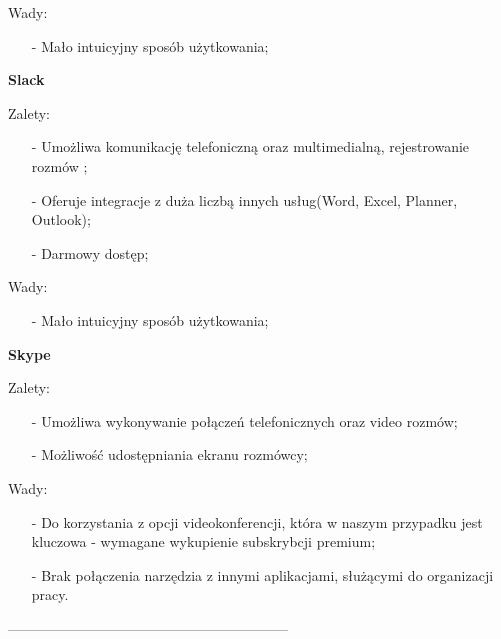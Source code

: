 \documentclass[a4paper,titleauthor]{mwart}
\begin{document}
\indent

Wady:
\begin{itemize}

\item[-]
Mało intuicyjny sposób użytkowania;
\end{itemize}
\vspace{0,8cm}

\textbf{Slack} \newline
\indent

Zalety:
\begin{itemize}

\item[-]
Umożliwa komunikację telefoniczną oraz multimedialną, rejestrowanie rozmów ;

\item[-]
Oferuje integracje z duża liczbą innych usług(Word, Excel, Planner, Outlook);

\item[-]
Darmowy dostęp;


\end{itemize}

\indent

Wady:
\begin{itemize}

\item[-]
Mało intuicyjny sposób użytkowania;
\end{itemize}

\vspace{0,8cm}
\textbf{Skype} \newline
\indent

Zalety:
\begin{itemize}

\item[-]
Umożliwa wykonywanie połączeń telefonicznych oraz video rozmów;

\item[-]
Możliwość udostępniania ekranu rozmówcy;

\end{itemize}

\indent

Wady:
\begin{itemize}

\item[-]
Do korzystania z opcji videokonferencji, która w naszym przypadku jest kluczowa - wymagane wykupienie subskrybcji premium;

\item[-]
Brak połączenia narzędzia z innymi aplikacjami, służącymi do organizacji pracy.
\end{itemize}
------------------------------------------------------------\newline \newline
{} \newline 
\end{document}
